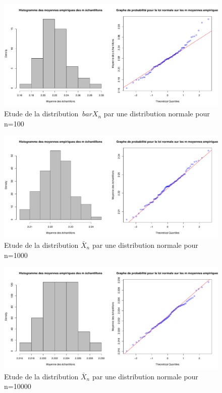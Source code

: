 \documentclass[12pt]{article}
\begin{document}
\begin{enumerate}
\begin{figure}[H]
\centering
\includegraphics[width=1.0\textwidth]{figures/GraphP2Q54.pdf}
\caption{Etude de la distribution $\ bar X_n$ par une distribution normale pour n=100}
\end{figure}

\begin{figure}[H]
\centering
\includegraphics[width=1.0\textwidth]{figures/GraphP2Q53.pdf}
\caption{Etude de la distribution $\bar X_n$ par une distribution normale pour n=1000}
\end{figure}

\begin{figure}[H]
\centering
\includegraphics[width=1.0\textwidth]{figures/GraphP2Q55.pdf}
\caption{Etude de la distribution $\bar X_n$ par une distribution normale pour n=10000}
\end{figure}


\end{enumerate}
\end{document}
